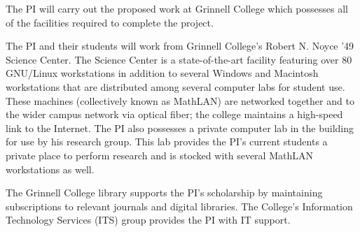 \documentclass[11pt]{article}
\begin{document}
\smalltitle{}

The PI will carry out the proposed work at Grinnell College which possesses all of the facilities required to complete the project.

The PI and their students will work from Grinnell College's Robert N. Noyce '49 Science Center.
The Science Center is a state-of-the-art facility featuring over 80 GNU/Linux workstations in addition to several Windows and Macintosh workstations that are distributed among several computer labs for student use.
These machines (collectively known as MathLAN) are networked together and to the wider campus network via optical fiber; the college maintains a high-speed link to the Internet.
The PI also possesses a private computer lab in the building for use by his research group.
This lab provides the PI's current students a private place to perform research and is stocked with several MathLAN workstations as well.

The Grinnell College library supports the PI's scholarship by maintaining subscriptions to relevant journals and digital libraries.
The College's Information Technology Services (ITS) group provides the PI with IT support.
\end{document}
